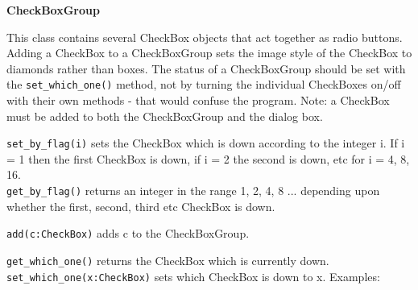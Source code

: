 
{\ttfamily\bfseries
{}CheckBoxGroup}

This class contains several CheckBox objects that act together as
{\textquotedbl}radio buttons{\textquotedbl}. Adding a CheckBox to a
CheckBoxGroup sets the image style of the CheckBox to diamonds rather
than boxes. The status of a CheckBoxGroup should be set with the
\texttt{set\_which\_one()} method, not by turning the individual CheckBoxes
on/off with their own methods - that would confuse the program. Note: a
CheckBox must be added to both the CheckBoxGroup and the dialog box.

\texttt{set\_by\_flag(i)} sets the CheckBox which is down according to the
integer i. If i = 1 then the first CheckBox is down, if i = 2 the
second is down, etc for i = 4, 8, 16.\\
\texttt{get\_by\_flag()} returns an integer in the range 1, 2, 4, 8 ... 
depending upon whether the first, second, third etc CheckBox is down.

\texttt{add(c:CheckBox)} adds c to the CheckBoxGroup.

\texttt{get\_which\_one()} returns the CheckBox which is currently down.\\
\texttt{set\_which\_one(x:CheckBox)} sets which CheckBox is down to x. Examples:

